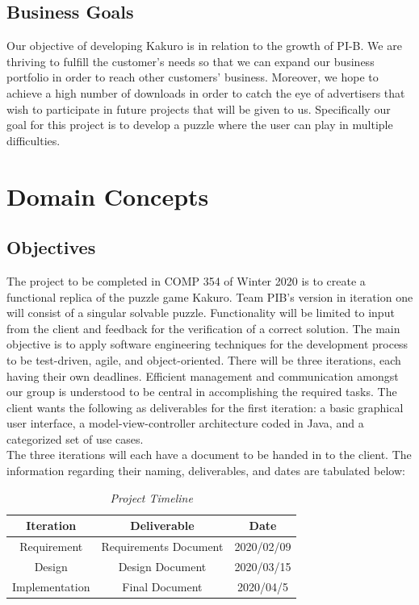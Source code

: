 \documentclass[12pt]{article}
\begin{document}
\subsection{Business Goals}

\hspace{\parindent} Our objective of developing Kakuro is in relation to the growth of PI-B. We are thriving to fulfill the customer’s needs so that we can expand our business portfolio in order to reach other customers’ business. Moreover, we hope to achieve a high number of downloads in order to catch the eye of advertisers that wish to participate in future projects that will be given to us. Specifically our goal for this project is to develop a puzzle where the user can play in multiple difficulties. 


\newpage
\pagestyle{plain} 
\section{Domain Concepts}
\subsection{Objectives}

The project to be completed in COMP 354 of Winter 2020 is to create a functional replica of the puzzle game Kakuro. Team PIB's version in iteration one will consist of a singular solvable puzzle. Functionality will be limited to input from the client and feedback for the verification of a correct solution. The main objective is to apply software engineering techniques for the development process to be test-driven, agile, and object-oriented. There will be three iterations, each having their own deadlines. Efficient management and communication amongst our group is understood to be central in accomplishing the required tasks. The client wants the following as deliverables for the first iteration: a basic graphical user interface, a model-view-controller architecture coded in Java, and a categorized set of use cases.\\  
The three iterations will each have a document to be handed in to the client. The information regarding their naming, deliverables, and dates are tabulated below:\\

\begin{table}[htbp]
\begin{center}
\begin{tabular}{| c | c | c |}
\hline
\cellcolor{gray}Iteration & \cellcolor{gray}Deliverable & \cellcolor{gray} Date \\
\hline
Requirement & Requirements Document & 2020/02/09 \\
\hline
Design & Design Document & 2020/03/15 \\
\hline
Implementation & Final Document & 2020/04/5 \\
\hline
\end{tabular}
\caption*{\textit {Project Timeline}}
\end{center}
\end{table}
\end{document}
